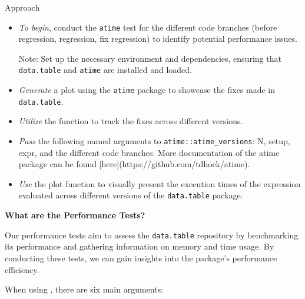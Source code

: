 \noindent Approach

\begin{itemize}
    
\item \textit{To begin}, conduct the \texttt{atime} test for the different code branches (before regression, regression, fix regression) to identify potential performance issues. 
\vspace{0.1in}

\noindent Note: Set up the necessary environment and dependencies, ensuring that \texttt{data.table} and \texttt{atime} are installed and loaded.
\vspace{0.1in}

\item \textit{Generate} a plot using the \texttt{atime} package to showcase the fixes made in \texttt{data.table}.

\vspace{0.1in}
\item \textit{Utilize} the  function to track the fixes across different versions.
\vspace{0.1in}

\item \textit{Pass} the following named arguments to \texttt{atime::atime\_versions}: N, setup, expr, and the different code branches. More documentation of the atime package can be found [here](https://github.com/tdhock/atime). 
\vspace{0.1in}

\item \textit{Use} the plot function to visually present the execution times of the expression evaluated across different versions of the \texttt{data.table} package.

\end{itemize}

\textbf{What are the Performance Tests?}

Our  performance tests aim to assess the \texttt{data.table} repository by benchmarking its performance and gathering information on memory and time usage. By conducting these tests, we can gain insights into the package’s performance efficiency.

When using , there are six main arguments:

